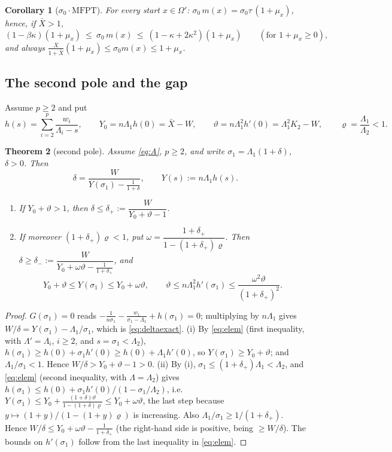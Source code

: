 \documentclass[11pt,a4paper]{article}
\newcommand{\Xb}{\bar X}
\theoremstyle{plain}
\newtheorem{theorem}{Theorem}[section]
\newtheorem{corollary}[theorem]{Corollary}
\theoremstyle{definition}
\numberwithin{equation}{section}
\begin{document}
\begin{corollary}[$\sigma_0\cdot\mathrm{MFPT}$]\label{cor:s0m}
For every start $x\in\Omega'$: $\sigma_0\,m(x)=\sigma_0\tau\,(1+\mu_x)$, hence, if $\Xb>1$,
\[
(1-\beta\kappa)(1+\mu_x)\ \le\ \sigma_0\,m(x)\ \le\ (1-\kappa+2\kappa^2)(1+\mu_x)\qquad(\text{for }1+\mu_x\ge0),
\]
and always $\frac{\Xb}{1+\Xb}(1+\mu_x)\le\sigma_0m(x)\le1+\mu_x$.
\end{corollary}

\subsection{The second pole and the gap}
Assume $p\ge2$ and put
\begin{equation}\label{eq:h}
h(s)=\sum_{i=2}^p\frac{w_i}{\Lambda_i-s},\qquad Y_0=n\Lambda_1h(0)=\Xb-W,\qquad \vartheta=n\Lambda_1^2h'(0)=\Lambda_1^2K_2-W,\qquad\varrho=\frac{\Lambda_1}{\Lambda_2}<1 .
\end{equation}

\begin{theorem}[second pole]\label{thm:sigma1}
Assume \eqref{eq:A}, $p\ge2$, and write $\sigma_1=\Lambda_1(1+\delta)$, $\delta>0$. Then
\begin{equation}\label{eq:deltaexact}
\delta=\frac{W}{Y(\sigma_1)-\frac1{1+\delta}},\qquad Y(s):=n\Lambda_1h(s).
\end{equation}
\begin{enumerate}
\item[(i)] If $Y_0+\vartheta>1$, then $\delta\le\delta_+:=\dfrac{W}{Y_0+\vartheta-1}$.
\item[(ii)] If moreover $(1+\delta_+)\varrho<1$, put $\omega=\dfrac{1+\delta_+}{1-(1+\delta_+)\varrho}$. Then $\delta\ge\delta_-:=\dfrac{W}{Y_0+\omega\vartheta-\frac1{1+\delta_+}}$, and
\[
Y_0+\vartheta\le Y(\sigma_1)\le Y_0+\omega\vartheta,\qquad \vartheta\le n\Lambda_1^2h'(\sigma_1)\le\frac{\omega^2\vartheta}{(1+\delta_+)^2}.
\]
\end{enumerate}
\end{theorem}
\begin{proof}
$G(\sigma_1)=0$ reads $-\frac1{n\sigma_1}-\frac{w_1}{\sigma_1-\Lambda_1}+h(\sigma_1)=0$; multiplying by $n\Lambda_1$ gives $W/\delta=Y(\sigma_1)-\Lambda_1/\sigma_1$, which is \eqref{eq:deltaexact}.
(i) By \eqref{eq:elem} (first inequality, with $\Lambda'=\Lambda_i$, $i\ge2$, and $s=\sigma_1<\Lambda_2$), $h(\sigma_1)\ge h(0)+\sigma_1h'(0)\ge h(0)+\Lambda_1h'(0)$, so $Y(\sigma_1)\ge Y_0+\vartheta$; and $\Lambda_1/\sigma_1<1$. Hence $W/\delta>Y_0+\vartheta-1>0$.
(ii) By (i), $\sigma_1\le(1+\delta_+)\Lambda_1<\Lambda_2$, and \eqref{eq:elem} (second inequality, with $\Lambda=\Lambda_2$) gives $h(\sigma_1)\le h(0)+\sigma_1h'(0)/(1-\sigma_1/\Lambda_2)$, i.e.\ $Y(\sigma_1)\le Y_0+\frac{(1+\delta)\vartheta}{1-(1+\delta)\varrho}\le Y_0+\omega\vartheta$, the last step because $y\mapsto(1+y)/(1-(1+y)\varrho)$ is increasing. Also $\Lambda_1/\sigma_1\ge1/(1+\delta_+)$. Hence $W/\delta\le Y_0+\omega\vartheta-\frac1{1+\delta_+}$ (the right-hand side is positive, being $\ge W/\delta$). The bounds on $h'(\sigma_1)$ follow from the last inequality in \eqref{eq:elem}.
\end{proof}
\end{document}
